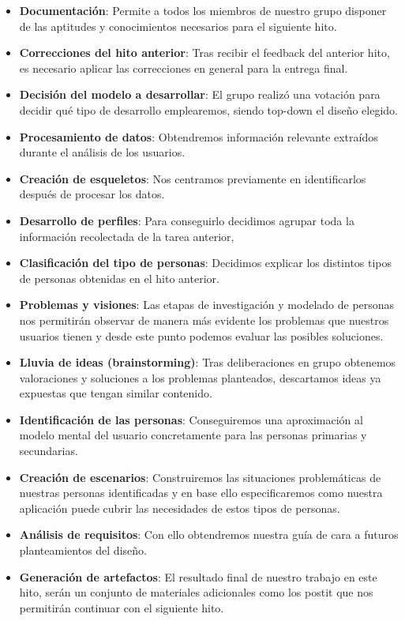 \documentclass[12pt]{article}
\begin{document}
\begin{itemize}

\item \textbf{Documentación}: Permite a todos los miembros de nuestro grupo disponer de las aptitudes y conocimientos necesarios para el siguiente hito.

\item \textbf{Correcciones del hito anterior}: Tras recibir el feedback del anterior hito, es
necesario aplicar las correcciones en general para la entrega final.

\item \textbf{Decisión del modelo a desarrollar}​: El grupo realizó una votación para decidir qué tipo de desarrollo emplearemos, siendo top-down el diseño elegido.

\item \textbf{Procesamiento de datos}: Obtendremos información relevante extraídos durante el análisis de los usuarios.

\item \textbf{Creación de esqueletos}: Nos centramos previamente en identificarlos después de procesar los datos.

\item \textbf{Desarrollo de perfiles}: Para conseguirlo decidimos agrupar toda la información recolectada
de la tarea anterior,

\item \textbf{Clasificación del tipo de personas}​: Decidimos explicar los distintos tipos de personas obtenidas en el hito anterior.


\item \textbf{Problemas y visiones}​: Las etapas de investigación y modelado de personas nos permitirán observar de manera más evidente los problemas que nuestros usuarios tienen y desde este punto podemos evaluar las posibles soluciones.

\item \textbf{Lluvia de ideas (brainstorming)}: Tras deliberaciones en grupo obtenemos valoraciones y soluciones a los problemas planteados, descartamos ideas ya expuestas que tengan similar contenido. 


\item \textbf{Identificación de las personas}: Conseguiremos una aproximación al modelo mental del usuario concretamente para las personas primarias y secundarias.


\item \textbf{Creación de escenarios}​: Construiremos las situaciones problemáticas de nuestras personas identificadas y en base ello especificaremos como nuestra aplicación puede cubrir las necesidades de estos tipos de personas.

\item \textbf{Análisis de requisitos}​: Con ello obtendremos nuestra guía de cara a futuros planteamientos del diseño. 


\item \textbf{Generación de artefactos}​: El resultado final de nuestro trabajo en este hito, serán un conjunto
de materiales adicionales como los postit que nos permitirán continuar con el siguiente hito. 

\end{itemize}
\end{document}
